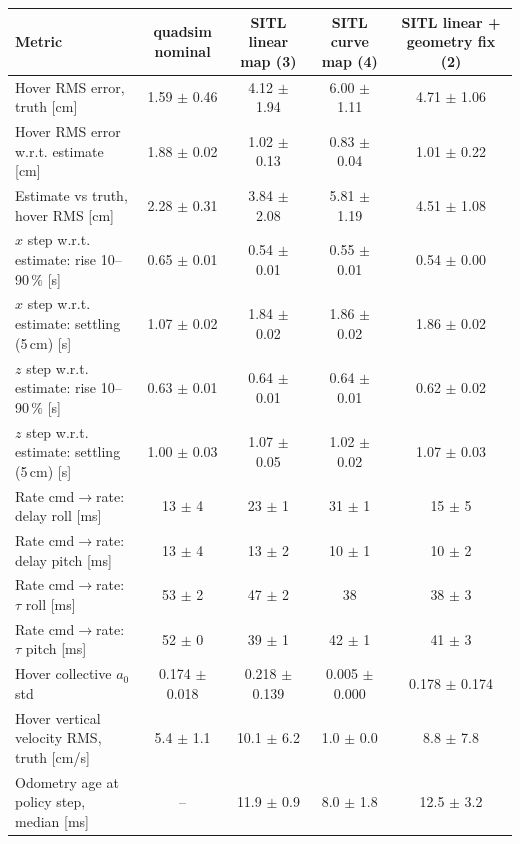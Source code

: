 \begin{tabular}{lcccc}\toprule
Metric & quadsim nominal & SITL linear map (3) & SITL curve map (4) & SITL linear + geometry fix (2)\\\midrule
Hover RMS error, truth [cm] & 1.59 $\pm$ 0.46 & 4.12 $\pm$ 1.94 & 6.00 $\pm$ 1.11 & 4.71 $\pm$ 1.06\\
Hover RMS error w.r.t. estimate [cm] & 1.88 $\pm$ 0.02 & 1.02 $\pm$ 0.13 & 0.83 $\pm$ 0.04 & 1.01 $\pm$ 0.22\\
Estimate vs truth, hover RMS [cm] & 2.28 $\pm$ 0.31 & 3.84 $\pm$ 2.08 & 5.81 $\pm$ 1.19 & 4.51 $\pm$ 1.08\\
$x$ step w.r.t. estimate: rise 10--90\,\% [s] & 0.65 $\pm$ 0.01 & 0.54 $\pm$ 0.01 & 0.55 $\pm$ 0.01 & 0.54 $\pm$ 0.00\\
$x$ step w.r.t. estimate: settling (5\,cm) [s] & 1.07 $\pm$ 0.02 & 1.84 $\pm$ 0.02 & 1.86 $\pm$ 0.02 & 1.86 $\pm$ 0.02\\
$z$ step w.r.t. estimate: rise 10--90\,\% [s] & 0.63 $\pm$ 0.01 & 0.64 $\pm$ 0.01 & 0.64 $\pm$ 0.01 & 0.62 $\pm$ 0.02\\
$z$ step w.r.t. estimate: settling (5\,cm) [s] & 1.00 $\pm$ 0.03 & 1.07 $\pm$ 0.05 & 1.02 $\pm$ 0.02 & 1.07 $\pm$ 0.03\\
Rate cmd$\to$rate: delay roll [ms] & 13 $\pm$ 4 & 23 $\pm$ 1 & 31 $\pm$ 1 & 15 $\pm$ 5\\
Rate cmd$\to$rate: delay pitch [ms] & 13 $\pm$ 4 & 13 $\pm$ 2 & 10 $\pm$ 1 & 10 $\pm$ 2\\
Rate cmd$\to$rate: $\tau$ roll [ms] & 53 $\pm$ 2 & 47 $\pm$ 2 & 38 & 38 $\pm$ 3\\
Rate cmd$\to$rate: $\tau$ pitch [ms] & 52 $\pm$ 0 & 39 $\pm$ 1 & 42 $\pm$ 1 & 41 $\pm$ 3\\
Hover collective $a_0$ std & 0.174 $\pm$ 0.018 & 0.218 $\pm$ 0.139 & 0.005 $\pm$ 0.000 & 0.178 $\pm$ 0.174\\
Hover vertical velocity RMS, truth [cm/s] & 5.4 $\pm$ 1.1 & 10.1 $\pm$ 6.2 & 1.0 $\pm$ 0.0 & 8.8 $\pm$ 7.8\\
Odometry age at policy step, median [ms] & -- & 11.9 $\pm$ 0.9 & 8.0 $\pm$ 1.8 & 12.5 $\pm$ 3.2\\
\bottomrule\end{tabular}

